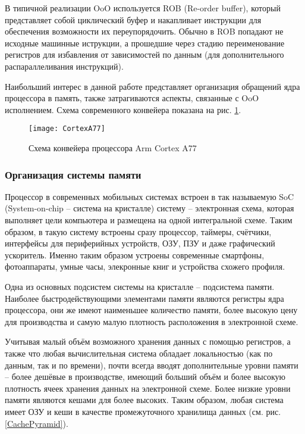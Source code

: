     В типичной реализации OoO используется ROB (Re-order buffer), который представляет собой
    циклический буфер и накапливает инструкции для обеспечения возможности их переупорядочить.
    Обычно в ROB попадают не исходные машинные иструкции, а прошедшие через стадию переименование
    регистров для избавления от зависимостей по данным (для дополнительного распараллеливания
    инструкций).

    Наибольший интерес в данной работе представляет организация обращений ядра процессора в память,
    также затрагиваются аспекты, связанные с OoO исполнением. Схема современного конвейера показана на
    рис. \ref{cortexA77}.

    \begin{figure}[!h]
        \caption{Схема конвейера процессора Arm Cortex A77 \cite{CortexA77Docs}}
        \centering
        \texttt{[image: CortexA77]}
        \label{cortexA77}
    \end{figure}

\subsubsection{Организация системы памяти}

    Процессор в современных мобильных системах встроен в так называемую SoC (System-on-chip --
    система на кристалле) систему -- электронная схема, которая выполняет цели компьютера
    и размещена на одной интегральной схеме. Таким образом, в такую систему встроены сразу процессор,
    таймеры, счётчики, интерфейсы для периферийных устройств, ОЗУ, ПЗУ и даже графический ускоритель.
    Именно таким образом устроены современные смартфоны, фотоаппараты, умные часы, элекронные книг
    и устройства схожего профиля.

    Одна из основных подсистем системы на кристалле -- подсистема памяти. Наиболее быстродействующими
    элементами памяти являются регистры ядра процессора, они же имеют наименьшее количество памяти,
    более высокую цену для производства и самую малую плотность расположения в электронной схеме.

    Учитывая малый объём возможного хранения данных с помощью регистров, а также
    что любая вычислительная система обладает локальностью (как по данным, так и по
    времени), почти всегда вводят дополнительные уровни памяти -- более дешёвые в производстве,
    имеющий больший объём и более высокую плотность ячеек хранения данных на электронной схеме.
    Более низкие уровни памяти являются кешами для более высоких.
    Таким образом, любая система имеет ОЗУ и кеши в качестве промежуточного хранилища данных
    (см. рис. \ref{CachePyramid}).

